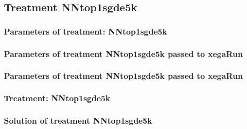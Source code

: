 \documentclass[18pt,c]{beamer}
\makeatletter
\def\beamer@writeslidentry@miniframesoff{%
  \expandafter\beamer@ifempty\expandafter{\beamer@framestartpage}{}%
  {%
   \clearpage\beamer@notesactions%
  }
}
\newcommand*{\miniframesoff}{\let\beamer@writeslidentry=\beamer@writeslidentry@miniframesoff}
\makeatother
\begin{document}
\miniframesoff
\subsection{Treatment NNtop1sgde5k}

 \begin{frame}
 \fontsize{8pt}{9pt}\selectfont
 \frametitle{  Parameters of treatment: NNtop1sgde5k 
 }

 \label{ExpDtParmTable024.tex}  
 \end{frame}


 \begin{frame}
 \fontsize{8pt}{9pt}\selectfont
 \frametitle{  Parameters of treatment NNtop1sgde5k passed to xegaRun
 }

 \label{ExpDtParmTable025.tex}  
 \end{frame}


 \begin{frame}
 \fontsize{8pt}{9pt}\selectfont
 \frametitle{  Parameters of treatment NNtop1sgde5k passed to xegaRun
 }

 \label{ExpDtParmTable026.tex}  
 \end{frame}

 \begin{frame}
 \fontsize{8pt}{9pt}\selectfont
 \frametitle{ Treatment: NNtop1sgde5k }

 \label{ExpDStatsTable011.tex}  
 \end{frame}

 \begin{frame}
 \fontsize{8pt}{9pt}\selectfont
 \frametitle{ Solution of treatment NNtop1sgde5k }

 \label{ExpDSolutionTable024.tex}  
 \end{frame}
\end{document}
